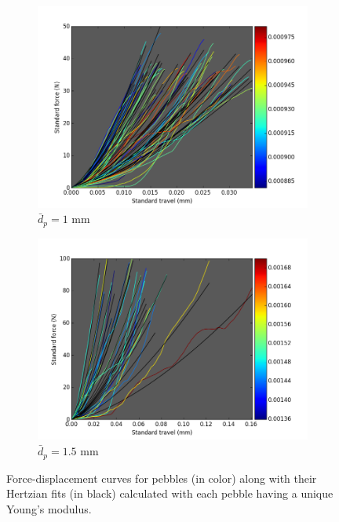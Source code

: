 \begin{figure}
        \centering
        \begin{subfigure}[b]{\imagewidth}
                \includegraphics[width=\textwidth]{chapters/figures/nfri-1mm-hertz-colormap.png}
                \caption{$\bar{d}_p = 1$ mm}
                \label{fig:nfri-1-exp-hertz}
        \end{subfigure}

        \begin{subfigure}[b]{\imagewidth}
                \includegraphics[width=\textwidth]{chapters/figures/nfri-1.5mm-hertz-colormap.png}
                \caption{$\bar{d}_p = 1.5$ mm}
                \label{fig:nfri-1.5-exp-hertz}
        \end{subfigure}
        \caption{Force-displacement curves for \lit pebbles (in color) along with their Hertzian fits (in black) calculated with each pebble having a unique Young's modulus.}\label{fig:nfri-exp-hertz}
\end{figure}

